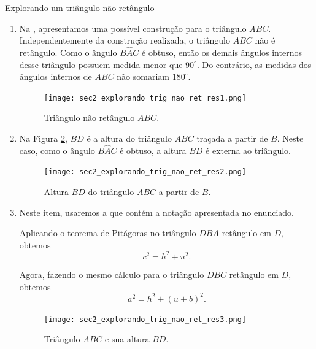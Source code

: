 \begin{answer}{Explorando um triângulo não retângulo}
{
\begin{enumerate}
    \item{}
    Na  , apresentamos uma possível construção para o triângulo $ABC$. Independentemente da construção realizada, o triângulo $ABC$ não é retângulo. Como o ângulo $B\hat{A}C$ é obtuso, então os demais ângulos internos desse triângulo possuem medida menor que $90^\circ$. Do contrário, as medidas dos ângulos internos de $ABC$ não somariam $180^\circ$.
    
    \begin{figure}[H]
    \centering
    \texttt{[image: sec2\_explorando\_trig\_nao\_ret\_res1.png]}
    \caption{Triângulo não retângulo $ABC$.}
    \label{sec2_trignaoret_resl_fig}
\end{figure}
    
    \item{}
    Na Figura \ref{sec2_trignaoret_res2_fig}, $BD$ é a  altura do triângulo $ABC$ traçada a partir de $B$. Neste caso, como o ângulo $B\hat{A}C$ é obtuso, a altura $BD$ é externa ao triângulo.
    \begin{figure}[H]
    \centering
    \texttt{[image: sec2\_explorando\_trig\_nao\_ret\_res2.png]}
    \caption{Altura $BD$ do triângulo $ABC$ a partir de $B$.}
    \label{sec2_trignaoret_res2_fig}
\end{figure}
    
    \item{}
    Neste item, usaremos a   que contém a notação apresentada no enunciado.
   
    Aplicando o teorema de Pitágoras no triângulo $DBA$ retângulo em $D$, obtemos 
    \begin{equation}
     c^2=h^2+u^2.   \label{sec2_at_trignaoret_eq1}
    \end{equation}
    
    Agora, fazendo o mesmo cálculo para o triângulo $DBC$ retângulo em $D$, obtemos 
    \begin{equation}
     a^2=h^2+(u+b)^2.   \label{sec2_at_trignaoret_eq2}
    \end{equation}
    \begin{figure}[H]
    \centering
    \texttt{[image: sec2\_explorando\_trig\_nao\_ret\_res3.png]}
    \caption{Triângulo $ABC$ e sua altura $BD$.}
    \label{sec2_trignaoret_res3_fig}
\end{figure}
    

\end{enumerate}}
\end{answer}
